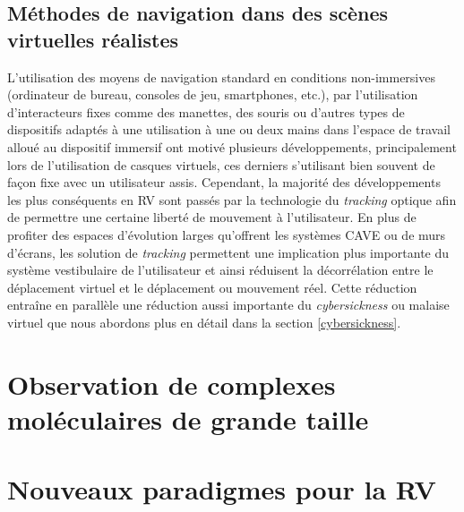 \subsection{Méthodes de navigation dans des scènes virtuelles réalistes}

L'utilisation des moyens de navigation standard en conditions non-immersives (ordinateur de bureau, consoles de jeu, smartphones, etc.), par l'utilisation d'interacteurs fixes comme des manettes, des souris ou d'autres types de dispositifs adaptés à une utilisation à une ou deux mains dans l'espace de travail alloué au dispositif immersif ont motivé plusieurs développements, principalement lors de l'utilisation de casques virtuels, ces derniers s'utilisant bien souvent de façon fixe avec un utilisateur assis. Cependant, la majorité des développements les plus conséquents en RV sont passés par la technologie du \textit{tracking} optique afin de permettre une certaine liberté de mouvement à l'utilisateur. En plus de profiter des espaces d'évolution larges qu'offrent les systèmes CAVE ou de murs d'écrans, les solution de \textit{tracking} permettent une implication plus importante du système vestibulaire de l'utilisateur et ainsi réduisent la décorrélation entre le déplacement virtuel et le déplacement ou mouvement réel. Cette réduction entraîne en parallèle une réduction aussi importante du \textit{cybersickness} ou malaise virtuel que nous abordons plus en détail dans la section \ref{cybersickness}.

\section{Observation de complexes moléculaires de grande taille}



\section{Nouveaux paradigmes pour la RV}



